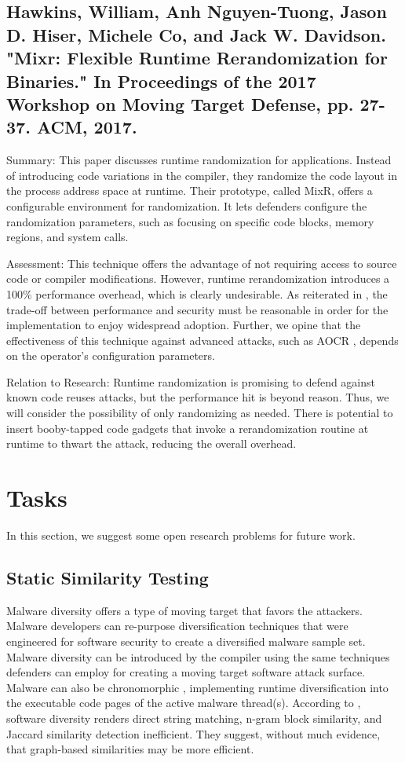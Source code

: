 \documentclass[preprint,12pt]{elsarticle}
\begin{document}
\subsection{
\cite{hawkins2017mixr} Hawkins, William, Anh Nguyen-Tuong, Jason D. Hiser, Michele Co, and Jack W. Davidson. "Mixr: Flexible Runtime Rerandomization for Binaries." In Proceedings of the 2017 Workshop on Moving Target Defense, pp. 27-37. ACM, 2017.
}

Summary: This paper discusses runtime randomization for applications. Instead of introducing code variations in the compiler, they randomize the code layout in the process address space at runtime. Their prototype, called MixR, offers a configurable environment for randomization. It lets defenders configure the randomization parameters, such as focusing on specific code blocks, memory regions, and system calls.

Assessment: This technique offers the advantage of not requiring access to source code or compiler modifications. However, runtime rerandomization introduces a 100\% performance overhead, which is clearly undesirable. As reiterated in \cite{szekeres2013sok}, the trade-off between performance and security must be reasonable in order for the implementation to enjoy widespread adoption. Further, we opine that the effectiveness of this technique against advanced attacks, such as AOCR \cite{rudd2017address}, depends on the operator's configuration parameters.

Relation to Research: Runtime randomization is promising to defend against known code reuses attacks, but the performance hit is beyond reason. Thus, we will consider the possibility of only randomizing as needed. There is potential to insert booby-tapped code gadgets that invoke a rerandomization routine at runtime to thwart the attack, reducing the overall overhead.


\section{Tasks}
\label{S:5}

In this section, we suggest some open research problems for future work.

\subsection{Static Similarity Testing}

Malware diversity \cite{payer2014embracing} offers a type of moving target that favors the attackers. Malware developers can re-purpose diversification techniques that were engineered for software security to create a diversified malware sample set. Malware diversity can be introduced by the compiler using the same techniques defenders can employ for creating a moving target software attack surface. Malware can also be chronomorphic \cite{friedman2015chronomorphic}, implementing runtime diversification into the executable code pages of the active malware thread(s). According to \cite{payer2014similarity}, software diversity renders direct string matching, n-gram block similarity, and Jaccard similarity detection inefficient. They suggest, without much evidence, that graph-based similarities may be more efficient.
\end{document}
